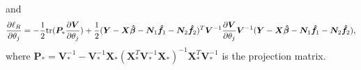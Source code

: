 \documentclass[12pt, notitlepage]{article}
\begin{document}
and 
\begin{equation} \label{score_theta}
{\partial \ell_R  \over \partial \theta_j}
=
- {1 \over 2}
{\rm tr} (\boldsymbol P_* {\partial \boldsymbol V \over \partial \theta_j})
+ {1 \over 2} 
(\boldsymbol Y - \boldsymbol X \boldsymbol {\hat\beta} - \boldsymbol N_1 \boldsymbol {\hat f}_1
 - \boldsymbol N_2 \boldsymbol {\hat f}_2)^T
\boldsymbol V^{-1}  
 {\partial \boldsymbol V \over \partial \theta_j}
 \boldsymbol V^{-1}  
(\boldsymbol Y - \boldsymbol X \boldsymbol {\hat\beta} - \boldsymbol N_1 \boldsymbol {\hat f}_1
 - \boldsymbol N_2 \boldsymbol {\hat f}_2),
\end{equation}
where 
$\boldsymbol P_* =  \boldsymbol V^{-1}_*
-\boldsymbol V^{-1}_*\boldsymbol X_*
(\boldsymbol X_*^T \boldsymbol V_*^{-1} \boldsymbol X_*)^{-1} 
\boldsymbol X_*^T \boldsymbol V^{-1}_*$ is the projection matrix. 
\end{document}
